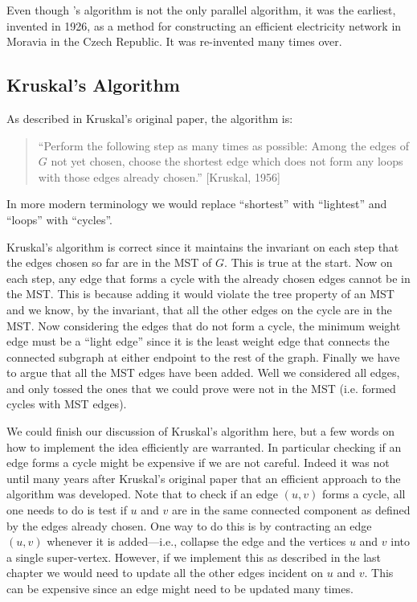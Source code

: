 \begin{remark}
Even though \boruvka's algorithm is not the only parallel algorithm, it
was the earliest, invented in 1926, as a method for constructing an
efficient electricity network in Moravia in the Czech Republic.  It
was re-invented many times over.
\end{remark}



\subsection{Kruskal's Algorithm}
As described in Kruskal's original paper, the algorithm is:
\begin{quote}
``Perform the following step as many times as possible: Among the edges
of $G$ not yet chosen, choose the shortest edge which does not form
any loops with those edges already chosen.'' [Kruskal, 1956]
\end{quote}
In more modern terminology we would replace ``shortest'' with
``lightest'' and ``loops'' with ``cycles''.  

Kruskal's algorithm is correct since it maintains the invariant on
each step that the edges chosen so far are in the MST of $G$.  This is
true at the start.  Now on each step, any edge that forms a cycle with
the already chosen edges cannot be in the MST.  This is because adding
it would violate the tree property of an MST and we know, by the
invariant, that all the other edges on the cycle are in the MST.  Now
considering the edges that do not form a cycle, the minimum weight
edge must be a ``light edge'' since it is the least weight edge that
connects the connected subgraph at either endpoint to the rest of the
graph.  Finally we have to argue that all the MST edges have been
added.  Well we considered all edges, and only tossed the ones that we
could prove were not in the MST (i.e. formed cycles with MST edges).

We could finish our discussion of Kruskal's algorithm here, but a few
words on how to implement the idea efficiently are warranted.  In
particular checking if an edge forms a cycle might be expensive if we
are not careful.  Indeed it was not until many years after Kruskal's
original paper that an efficient approach to the algorithm was
developed.  Note that to check if an edge $(u,v)$ forms a cycle, all
one needs to do is test if $u$ and $v$ are in the same connected
component as defined by the edges already chosen.  One way to do
this is by contracting an edge $(u,v)$ whenever it is added---i.e.,
collapse the edge and the vertices $u$ and $v$ into a single
super-vertex.  However, if we implement this as described in the last
chapter we would need to update all the other edges incident on $u$
and $v$.  This can be expensive since an edge might need to be updated
many times.  

